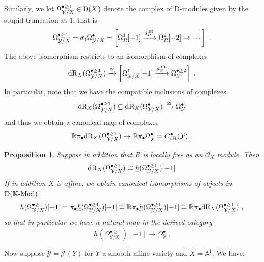 \documentclass[11pt]{amsart}
\numberwithin{equation}{section}
\newtheorem{prop}[theo]{Proposition}
\theoremstyle{definition}
\newcommand{\bb}{\mathbb}
\newcommand{\mc}{\mathcal}
\newcommand{\Mod}{{\textup{-Mod}}}
\newcommand{\K}{{\bb K}}
\newcommand{\dR}{{\textup{dR}}}
\newcommand{\0}{{\textbf{0}}}
\newcommand{\Dd}{{\textup{D}}}
\begin{document}
Similarly, we let $\Omega^{\bullet\geq 1}_{\mc Y/X}\in \Dd(X)$ denote the complex of D-modules given by the stupid truncation at $1$, that is
\[\Omega^{\bullet\geq 1}_{\mc Y/X} = \sigma_1\Omega^\bullet_{\mc Y/X} = \left[  \Omega^1_R[-1] \xrightarrow{d^\dR_R}\Omega^{2}_R[-2] \to\cdots \right]  \ . \]
The above isomorphism restricts to an isomorphism of complexes
\[ \dR_X(\Omega^{\bullet \geq 1}_{\mc Y/X}) \xrightarrow{\cong} \left[  \Omega^1_{\mc Y/X}[-1] \xrightarrow{d^\dR_{\mc Y}} \Omega^{\bullet \geq 2}_{\mc Y} \right] \ . \]
In particular, note that we have the compatible inclusions of complexes
\begin{equation}\label{subcxeqn}
	 \dR_X(\Omega^{\bullet \geq 1}_{\mc Y/X}) \subseteq \dR_X( \Omega^\bullet_{\mc Y/X}) \xrightarrow{\cong} \Omega^\bullet_{\mc Y} 
\end{equation}   
and thus we obtain a canonical map of complexes
\[ \bb R \pi_\bullet \dR_X(\Omega^{\bullet \geq 1}_{\mc Y/X}) \to  \bb R \pi_\bullet  \Omega^\bullet_{\mc Y} =C^\bullet_\dR(\mc Y) \ .  \]

\begin{prop}\label{hdRcompprop} Suppose in addition that $R$ is locally free as an $\mc O_X$ module. Then
\[ \dR_X(\Omega^{\bullet \geq 1}_{\mc Y/X})  \cong \underline h(\Omega^{\bullet \geq 1}_{\mc Y/X})[-1] \]
If in addition $X$ is affine, we obtain canonical isomorphisms of objects in $\Dd(\K\Mod)$
\[ h(\Omega^{\bullet \geq 1}_{\mc Y/X})[-1]=\pi_\bullet \underline h(\Omega^{\bullet \geq 1}_{\mc Y/X})[-1]  \cong \bb R\pi_\bullet  \underline h(\Omega^{\bullet \geq 1}_{\mc Y/X})[-1]  \cong  \bb R\pi_\bullet \dR_X(\Omega^{\bullet \geq 1}_{\mc Y/X}) \ , \]
so that in particular we have a natural map in the derived category
\begin{equation}\label{compmapeqn}
	 h(\Omega^{\bullet \geq 1}_{\mc Y/X})[-1] \to \Omega^\bullet_{\mc Y} \ .
\end{equation}
\end{prop}


Now suppose $\mc Y=\mc J(Y)$ for $Y$ a smooth affine variety and $X=\bb A^1$. We have:
\end{document}
